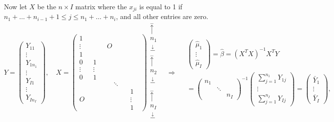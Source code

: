 Now let $X$ be the $n\times I$ matrix where the $x_{ji}$ is equal to 1 if $n_1+\dots+n_{i-1}+1\leq j\leq n_1+\dots+n_i$, and all other entries are zero.
\begin{equation}
Y = \left(
\begin{array}{c}
Y_{11}\\
\vdots \\
Y_{1n_1} \\
\vdots \\
Y_{I1}\\
\vdots \\
Y_{In_I}
\end{array}
\right),\quad
X = \left(
\begin{array}{cccc}
1  & & & \\
\vdots\quad  & & O & \\
1 & & & \\
0 & 1 & & \\
\vdots & \vdots\quad & & \\
0 & 1 & &  \\
& & \quad \ddots\quad & \\
& & & 1\\
O & & & \vdots\quad \\
& & & 1
\end{array}
\right)
\begin{array}{c}
\stackrel{-}{\uparrow}  \\
n_1 \\
\stackrel\downarrow{-}  \\
\stackrel{-}{\uparrow}  \\
n_2 \\
\stackrel\downarrow{-}   \\
\\
\stackrel{-}{\uparrow}  \\
n_I \\
\stackrel\downarrow{-}  \\
\end{array}
\quad\Rightarrow \quad
\begin{array}{c}
\left(
\begin{array}{c}
\hat{\mu}_1\\
\vdots \\
\hat{\mu}_I
\end{array}
\right) = \hat{\beta}= (X^TX)^{-1}X^TY
 \quad\quad\quad\quad\quad\quad\quad\quad\quad\quad\quad\quad\\
= \left(
\begin{array}{ccc}
n_1 & & \\
& \ddots & \\
& & n_I
\end{array}
\right)^{-1}
\left(
\begin{array}{c}
\sum^{n_1}_{j=1}Y_{1j} \\
\vdots \\
\sum^{n_I}_{j=1}Y_{Ij}
\end{array}
\right) = \left(
\begin{array}{c}
\bar{Y}_1\\
\vdots \\
\bar{Y}_I
\end{array}
\right),
\end{array}
\end{equation}
